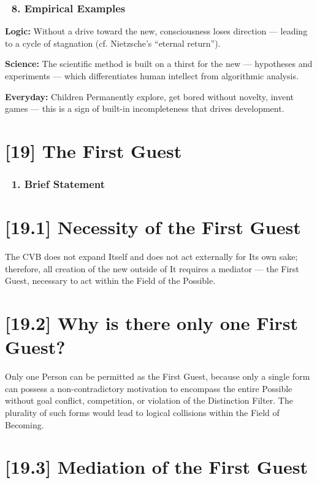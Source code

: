 \documentclass[12pt]{article}
\begin{document}
\subsubsection*{🔹 8. Empirical Examples}

\textbf{Logic:} Without a drive toward the new, consciousness loses direction — leading to a cycle of stagnation (cf. Nietzsche's ``eternal return'').

\textbf{Science:} The scientific method is built on a thirst for the new — hypotheses and experiments — which differentiates human intellect from algorithmic analysis.

\textbf{Everyday:} Children Permanently explore, get bored without novelty, invent games — this is a sign of built-in incompleteness that drives development.



\section*{[19] The First Guest}

\subsubsection*{🔹 1. Brief Statement}

\section*{[19.1] Necessity of the First Guest}

The CVB does not expand Itself and does not act externally for Its own sake; therefore, all creation of the new outside of It requires a mediator — the First Guest, necessary to act within the Field of the Possible.

\section*{[19.2] Why is there only one First Guest?}

Only one Person can be permitted as the First Guest, because only a single form can possess a non-contradictory motivation to encompass the entire Possible without goal conflict, competition, or violation of the Distinction Filter. The plurality of such forms would lead to logical collisions within the Field of Becoming.

\section*{[19.3] Mediation of the First Guest}
\end{document}
